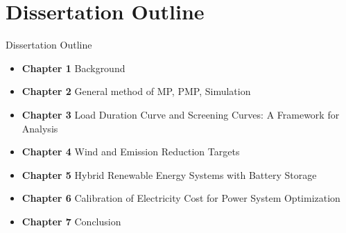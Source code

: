 \documentclass[newPxFont,numfooter,progressbar,sectionpages]{beamer}
\begin{document}
%
%
\section{Dissertation Outline}



\begin{frame}[c]{Dissertation Outline}


\begin{itemize}
	\item \textbf{Chapter 1} Background
	\item \textbf{Chapter 2} General method of MP, PMP, Simulation
	\item \textbf{Chapter 3} Load Duration Curve and Screening Curves: A Framework for Analysis
	\item \textbf{Chapter 4} Wind and Emission Reduction Targets
	\item \textbf{Chapter 5} Hybrid Renewable Energy Systems with Battery Storage
	\item \textbf{Chapter 6} Calibration of Electricity Cost for Power System Optimization
	\item \textbf{Chapter 7} Conclusion


\end{itemize}

\end{frame}




%
%
%





%
%
\end{document}
